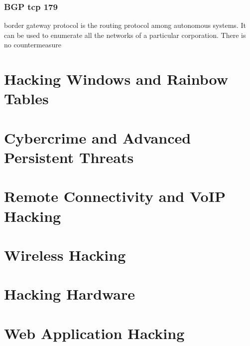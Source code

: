 \subsection{BGP tcp 179}
border gateway protocol is the routing protocol among autonomous systems. It can be used to enumerate all the networks of a particular corporation. There is no countermeasure

\chapter{Hacking Windows and Rainbow Tables}
\section{}

\chapter{Cybercrime and Advanced Persistent Threats}
\section{}

\chapter{Remote Connectivity and VoIP Hacking}
\section{}

\chapter{Wireless Hacking}
\section{}

\chapter{Hacking Hardware}
\section{}

\chapter{Web Application Hacking}
